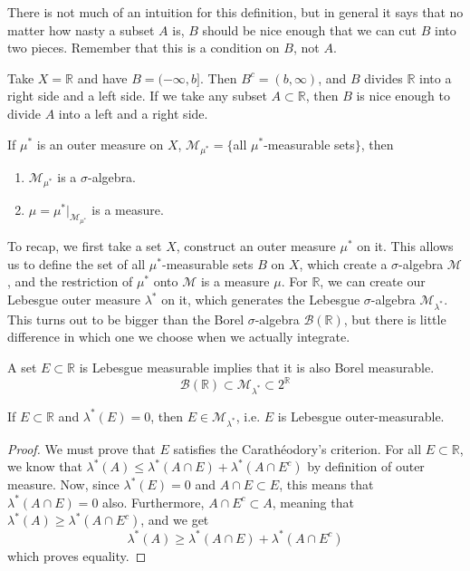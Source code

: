 \documentclass{article}
\begin{document}
There is not much of an intuition for this definition, but in general it says that no matter how nasty a subset $A$ is, $B$ should be nice enough that we can cut $B$ into two pieces. Remember that this is a condition on $B$, not $A$. 

\begin{example}
  Take $X = \mathbb{R}$ and have $B = (-\infty, b]$. Then $B^c = (b, \infty)$, and $B$ divides $\mathbb{R}$ into a right side and a left side. If we take any subset $A \subset \mathbb{R}$, then $B$ is nice enough to divide $A$ into a left and a right side. 
\end{example}

\begin{theorem}
  If $\mu^*$ is an outer measure on $X$, $\mathcal{M}_{\mu^*} = \{$all $\mu^*$-measurable sets$\}$, then 
  \begin{enumerate}
    \item $\mathcal{M}_{\mu^*}$ is a $\sigma$-algebra. 
    \item $\mu = \mu^* \big|_{\mathcal{M}_{\mu^*}}$ is a measure. 
  \end{enumerate}
\end{theorem}

To recap, we first take a set $X$, construct an outer measure $\mu^*$ on it. This allows us to define the set of all $\mu^*$-measurable sets $B$ on $X$, which create a $\sigma$-algebra $\mathcal{M}$, and the restriction of $\mu^*$ onto $\mathcal{M}$ is a measure $\mu$. For $\mathbb{R}$, we can create our Lebesgue outer measure $\lambda^*$ on it, which generates the Lebesgue $\sigma$-algebra $\mathcal{M}_{\lambda^*}$. This turns out to be bigger than the Borel $\sigma$-algebra $\mathcal{B}(\mathbb{R})$, but there is little difference in which one we choose when we actually integrate. 

\begin{theorem}
  A set $E \subset \mathbb{R}$ is Lebesgue measurable implies that it is also Borel measurable. 
  \[\mathcal{B}(\mathbb{R}) \subset \mathcal{M}_{\lambda^*} \subset 2^\mathbb{R}\]
\end{theorem}

\begin{lemma}
  If $E \subset \mathbb{R}$ and $\lambda^*(E) = 0$, then $E \in \mathcal{M}_{\lambda^*}$, i.e. $E$ is Lebesgue outer-measurable. 
\end{lemma}
\begin{proof}
  We must prove that $E$ satisfies the Carathéodory's criterion. For all $E \subset \mathbb{R}$, we know that $\lambda^*(A) \leq \lambda^*(A \cap E) + \lambda^*(A \cap E^c)$ by definition of outer measure. Now, since $\lambda^* (E) =0$ and $A \cap E \subset E$, this means that $\lambda^* (A \cap E) = 0$ also. Furthermore, $A \cap E^c \subset A$, meaning that $\lambda^*(A) \geq \lambda^* (A \cap E^c)$, and we get 
  \[\lambda^*(A) \geq \lambda^*(A \cap E) + \lambda^*(A \cap E^c)\]
  which proves equality. 
\end{proof}
\end{document}
